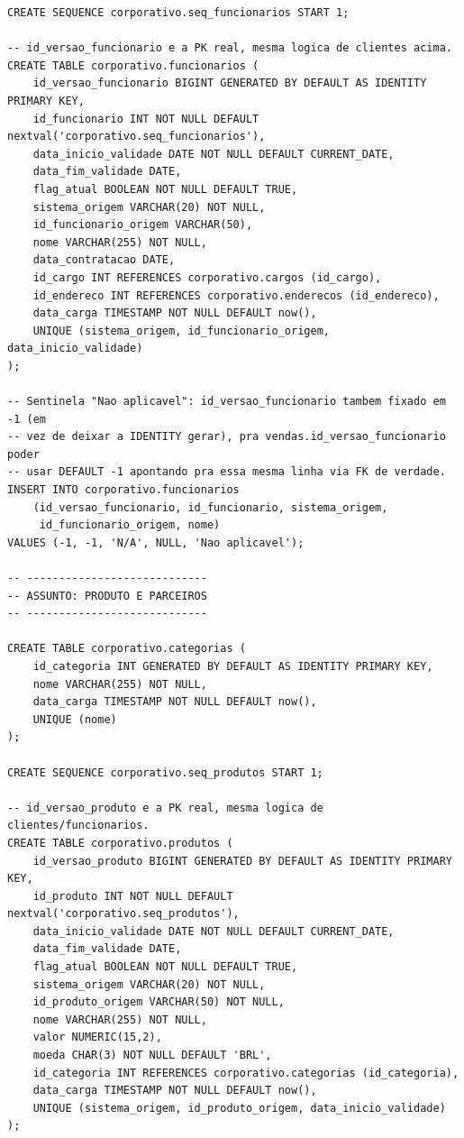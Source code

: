 {\begin{verbatim}
CREATE SEQUENCE corporativo.seq_funcionarios START 1;

-- id_versao_funcionario e a PK real, mesma logica de clientes acima.
CREATE TABLE corporativo.funcionarios (
    id_versao_funcionario BIGINT GENERATED BY DEFAULT AS IDENTITY PRIMARY KEY,
    id_funcionario INT NOT NULL DEFAULT nextval('corporativo.seq_funcionarios'),
    data_inicio_validade DATE NOT NULL DEFAULT CURRENT_DATE,
    data_fim_validade DATE,
    flag_atual BOOLEAN NOT NULL DEFAULT TRUE,
    sistema_origem VARCHAR(20) NOT NULL,
    id_funcionario_origem VARCHAR(50),
    nome VARCHAR(255) NOT NULL,
    data_contratacao DATE,
    id_cargo INT REFERENCES corporativo.cargos (id_cargo),
    id_endereco INT REFERENCES corporativo.enderecos (id_endereco),
    data_carga TIMESTAMP NOT NULL DEFAULT now(),
    UNIQUE (sistema_origem, id_funcionario_origem, data_inicio_validade)
);

-- Sentinela "Nao aplicavel": id_versao_funcionario tambem fixado em -1 (em
-- vez de deixar a IDENTITY gerar), pra vendas.id_versao_funcionario poder
-- usar DEFAULT -1 apontando pra essa mesma linha via FK de verdade.
INSERT INTO corporativo.funcionarios
    (id_versao_funcionario, id_funcionario, sistema_origem,
     id_funcionario_origem, nome)
VALUES (-1, -1, 'N/A', NULL, 'Nao aplicavel');

-- ----------------------------
-- ASSUNTO: PRODUTO E PARCEIROS
-- ----------------------------

CREATE TABLE corporativo.categorias (
    id_categoria INT GENERATED BY DEFAULT AS IDENTITY PRIMARY KEY,
    nome VARCHAR(255) NOT NULL,
    data_carga TIMESTAMP NOT NULL DEFAULT now(),
    UNIQUE (nome)
);

CREATE SEQUENCE corporativo.seq_produtos START 1;

-- id_versao_produto e a PK real, mesma logica de clientes/funcionarios.
CREATE TABLE corporativo.produtos (
    id_versao_produto BIGINT GENERATED BY DEFAULT AS IDENTITY PRIMARY KEY,
    id_produto INT NOT NULL DEFAULT nextval('corporativo.seq_produtos'),
    data_inicio_validade DATE NOT NULL DEFAULT CURRENT_DATE,
    data_fim_validade DATE,
    flag_atual BOOLEAN NOT NULL DEFAULT TRUE,
    sistema_origem VARCHAR(20) NOT NULL,
    id_produto_origem VARCHAR(50) NOT NULL,
    nome VARCHAR(255) NOT NULL,
    valor NUMERIC(15,2),
    moeda CHAR(3) NOT NULL DEFAULT 'BRL',
    id_categoria INT REFERENCES corporativo.categorias (id_categoria),
    data_carga TIMESTAMP NOT NULL DEFAULT now(),
    UNIQUE (sistema_origem, id_produto_origem, data_inicio_validade)
);


\end{verbatim}}
